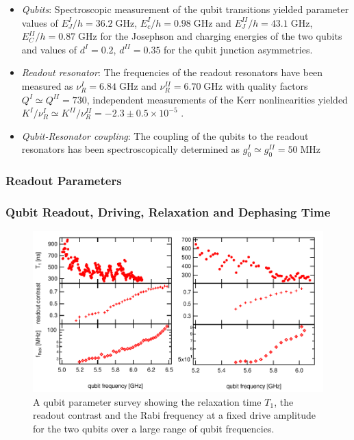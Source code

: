 \begin{itemize}
\item \textit{Qubits}: Spectroscopic measurement of the qubit transitions yielded parameter values of $E_J^I / h = 36.2\; \mathrm{GHz}$, $E_c^I / h = 0.98 \; \mathrm{GHz}$ and $E_J^{II} / h = 43.1\; \mathrm{GHz}$, $E_C^{II} / h = 0.87 \; \mathrm{GHz}$ for the Josephson and charging energies of the two qubits and values of $d^I = 0.2$, $d^{II} =  0.35$ for the qubit junction asymmetries.
\item \textit{Readout resonator}: The frequencies of the readout resonators have been measured as $\nu_R^I = 6.84 \; \mathrm{GHz}$ and $\nu_R^{II} = 6.70 \; \mathrm{GHz}$ with quality factors $Q^I \simeq Q^{II} = 730$, independent measurements of the Kerr nonlinearities yielded $K^I / \nu_R^I \simeq K^{II} / \nu_R^{II} = -2.3\pm 0.5 \times 10^{-5}$ .
\item \textit{Qubit-Resonator coupling}: The coupling of the qubits to the readout resonators has been spectroscopically determined as $g_0^I \simeq g_0^{II} = 50 \; \mathrm{MHz}$
\end{itemize}

\subsubsection{Readout Parameters}

\subsubsection{Qubit Readout, Driving, Relaxation and Dephasing Time}

\begin{figure}[ht!]
   \centering
	 \includegraphics[width=1\textwidth]{"./data/ct5/qubits - parameter surveys/qubit parameters"}
	 \caption[A qubit parameter survey showing $T_1$, readout contrast and Rabi frequency of the two qubits over a large range of qubit frequencies]{A qubit parameter survey showing the relaxation time $T_1$, the readout contrast and the Rabi frequency at a fixed drive amplitude for the two qubits over a large range of qubit frequencies.}
	 \label{fig:qubit_parameters}
\end{figure}


